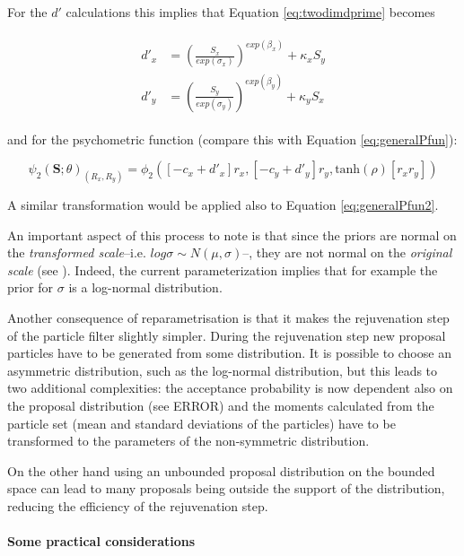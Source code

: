 \documentclass{article}\usepackage{knitr}
\begin{document}
For the $d'$ calculations this implies that Equation \ref{eq:twodimdprime} becomes

\begin{align}
\begin{split}
d'_x &= (\frac{S_x}{exp(\sigma_x)})^{exp(\beta_x)} + \kappa_x S_y \\
d'_y &= (\frac{S_y}{exp(\sigma_y)})^{exp(\beta_y)} + \kappa_y S_x
\end{split}
\end{align}

and for the psychometric function (compare this with Equation \ref{eq:generalPfun}):

\begin{equation}
\psi_2(\bm{S}; \theta)_{(R_x, R_y)} = \phi_2([-c_x + d'_x]r_x, [-c_y + d'_y] r_y, \text{tanh}(\rho) [r_x r_y])
\end{equation}

A similar transformation would be applied also to Equation \ref{eq:generalPfun2}.

An important aspect of this process to note is that since the priors are normal on the \textit{transformed scale}--i.e. $log\sigma \sim N(\mu, \sigma)$--, they are not normal on the \textit{original scale} (see \citealt[pp. 729 - 732]{kruschke2015}). Indeed, the current parameterization implies that for  example the prior for $\sigma$ is a log-normal distribution.

Another consequence of reparametrisation is that it makes the rejuvenation step of the particle filter slightly simpler. During the rejuvenation step new proposal particles have to be generated from some distribution. It is possible to choose an asymmetric distribution, such as the log-normal distribution, but this leads to two additional complexities: the acceptance probability is now dependent also on the proposal distribution (see ERROR) and the moments calculated from the particle set (mean and standard deviations of the particles) have to be transformed to the parameters of the non-symmetric distribution. 

On the other hand using an unbounded proposal distribution on the bounded space can lead to many proposals  being  outside the support of the distribution, reducing the efficiency of the rejuvenation step.

\paragraph{Some practical considerations}
\label{sec:practical_considerations}
\end{document}
